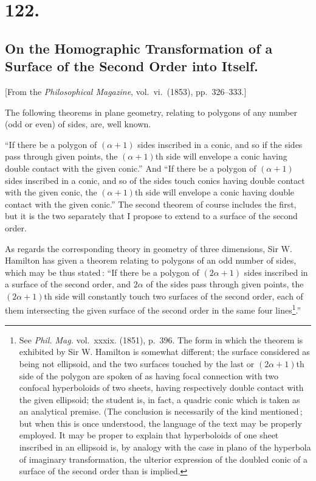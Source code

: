 \documentclass[11pt,a4paper]{article}
\theoremstyle{definition}
\begin{document}
\section*{122.}
\subsection*{On the Homographic Transformation of a Surface of the Second Order into Itself.}

[From the \textit{Philosophical Magazine}, vol.\ vi.\ (1853), pp.\ 326--333.]

\medskip

The following theorems in plane geometry, relating to polygons of any number
(odd or even) of sides, are, well known.

``If there be a polygon of $(\alpha+1)$ sides inscribed in a conic, and so if the
sides pass through given points, the $(\alpha+1)$th side will envelope a conic having double
contact with the given conic.'' And ``If there be a polygon of $(\alpha+1)$ sides inscribed
in a conic, and so of the sides touch conics having double contact with the given
conic, the $(\alpha+1)$th side will envelope a conic having double contact with the given
conic.'' The second theorem of course includes the first, but it is the two separately
that I propose to extend to a surface of the second order.

\medskip

As regards the corresponding theory in geometry of three dimensions, Sir W. Hamilton
has given a theorem relating to polygons of an odd number of sides, which may be
thus stated\,: ``If there be a polygon of $(2\alpha+1)$ sides inscribed in a surface of the
second order, and $2\alpha$ of the sides pass through given points, the $(2\alpha+1)$th side will
constantly touch two surfaces of the second order, each of them intersecting the given
surface of the second order in the same four lines\footnote{See \textit{Phil. Mag.} vol.\ xxxix. (1851), p.\ 396. The form in which the theorem is exhibited by Sir W. Hamilton is somewhat different; the surface considered as being not ellipsoid, and the two surfaces touched by the last or $(2\alpha+1)$th side of the polygon are spoken of as having focal connection with two confocal hyperboloids of two sheets, having respectively double contact with the given ellipsoid; the student is, in fact, a quadric conic which is taken as an analytical premise. (The conclusion is necessarily of the kind mentioned\,; but when this is once understood, the language of the text may be properly employed. It may be proper to explain that hyperboloids of one sheet inscribed in an ellipsoid is, by analogy with the case in plano of the hyperbola of imaginary transformation, the ulterior expression of the doubled conic of a surface of the second order than is implied.}.''
\end{document}
